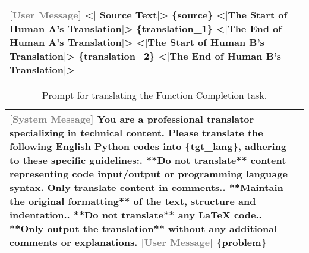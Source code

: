 \begin{table*}[ht]
\begin{tabularx}{0.95\textwidth}{X}
    \textbf{\textcolor{gray}{[User Message]}}\newline
    \textless$|$ Source Text$|$\textgreater\newline
    \{source\}\newline
    \newline
    \textless$|$The Start of Human A's Translation$|$\textgreater\newline
    \{translation\_1\}\newline
    \textless$|$The End of Human A's Translation$|$\textgreater\newline
    \newline
    \textless$|$The Start of Human B's Translation$|$\textgreater\newline
    \{translation\_2\}\newline
    \textless$|$The End of Human B's Translation$|$\textgreater\\
    \bottomrule
    \end{tabularx}
\end{table*}

\begin{table*}[ht]
    \caption{Prompt for translating the Function Completion task.}
    \label{tab:translate_func_compl}
    \vskip 0.15in
    \centering
    \begin{tabularx}{0.95\textwidth}{X}
    \toprule
    \textbf{\textcolor{gray}{[System Message]}}\newline
    You are a professional translator specializing in technical content. Please translate the following English Python codes into \{tgt\_lang\}, adhering to these specific guidelines:\newline\newline
    1. **Do not translate** content representing code input/output or programming language syntax. Only translate content in comments.\newline
    2. **Maintain the original formatting** of the text, structure and indentation.\newline
    3. **Do not translate** any LaTeX code.\newline
    4. **Only output the translation** without any additional comments or explanations.\newline
    \textbf{\textcolor{gray}{[User Message]}}\newline
    \{problem\}\\
    \bottomrule
    \end{tabularx}
\end{table*}

